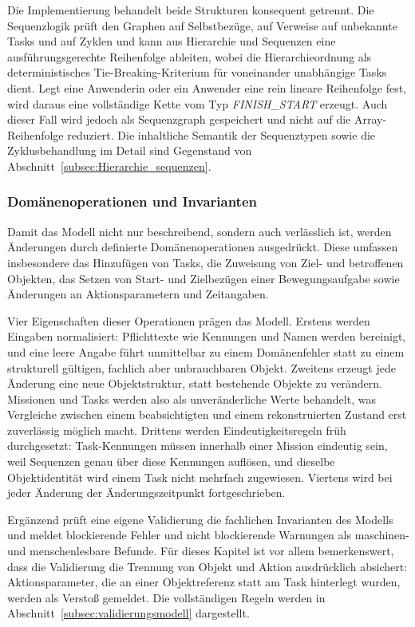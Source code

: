 Die Implementierung behandelt beide Strukturen konsequent getrennt. Die Sequenzlogik prüft den
Graphen auf Selbstbezüge, auf Verweise auf unbekannte Tasks und auf Zyklen und kann aus Hierarchie
und Sequenzen eine ausführungsgerechte Reihenfolge ableiten, wobei die Hierarchieordnung als
deterministisches Tie-Breaking-Kriterium für voneinander unabhängige Tasks dient. Legt eine
Anwenderin oder ein Anwender eine rein lineare Reihenfolge fest, wird daraus eine vollständige Kette
vom Typ \textit{FINISH\_START} erzeugt. Auch dieser Fall wird jedoch als Sequenzgraph gespeichert und nicht
auf die Array-Reihenfolge reduziert. Die inhaltliche Semantik der Sequenztypen sowie die
Zyklusbehandlung im Detail sind Gegenstand von Abschnitt~\ref{subsec:Hierarchie_sequenzen}.

\subsubsection{Domänenoperationen und Invarianten}
Damit das Modell nicht nur beschreibend, sondern auch verlässlich ist, werden Änderungen durch
definierte Domänenoperationen ausgedrückt. Diese umfassen insbesondere das Hinzufügen von Tasks, die
Zuweisung von Ziel- und betroffenen Objekten, das Setzen von Start- und Zielbezügen einer
Bewegungsaufgabe sowie Änderungen an Aktionsparametern und Zeitangaben.

Vier Eigenschaften dieser Operationen prägen das Modell. Erstens werden Eingaben normalisiert:
Pflichttexte wie Kennungen und Namen werden bereinigt, und eine leere Angabe führt unmittelbar zu
einem Domänenfehler statt zu einem strukturell gültigen, fachlich aber unbrauchbaren Objekt.
Zweitens erzeugt jede Änderung eine neue Objektstruktur, statt bestehende Objekte zu verändern.
Missionen und Tasks werden also als unveränderliche Werte behandelt, was Vergleiche zwischen einem
beabsichtigten und einem rekonstruierten Zustand erst zuverlässig möglich macht. Drittens werden
Eindeutigkeitsregeln früh durchgesetzt: Task-Kennungen müssen innerhalb einer Mission eindeutig
sein, weil Sequenzen genau über diese Kennungen auflösen, und dieselbe Objektidentität wird einem
Task nicht mehrfach zugewiesen. Viertens wird bei jeder Änderung der Änderungszeitpunkt
fortgeschrieben.

Ergänzend prüft eine eigene Validierung die fachlichen Invarianten des Modells und meldet
blockierende Fehler und nicht blockierende Warnungen als maschinen- und menschenlesbare Befunde. Für
dieses Kapitel ist vor allem bemerkenswert, dass die Validierung die Trennung von Objekt und Aktion
ausdrücklich absichert: Aktionsparameter, die an einer Objektreferenz statt am Task hinterlegt
wurden, werden als Verstoß gemeldet. Die vollständigen
Regeln werden in Abschnitt~\ref{subsec:validierungsmodell} dargestellt.

